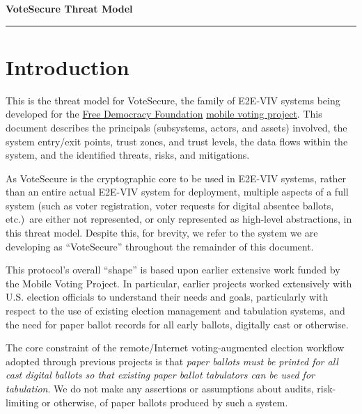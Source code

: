 \documentclass[10pt,letterpaper]{article}
\begin{document}
\begin{center}
{\Large \textbf{VoteSecure Threat Model}}
\end{center}
\vspace{-6pt}

 \hspace{\fill} \textit{\tmdate}

\vspace{-12pt}

\rule{\textwidth}{1pt}

\tableofcontents

\section*{Introduction}
\label{sec:intro}

This is the threat model for VoteSecure, the family of E2E-VIV systems being developed for the \href{https://freedemocracyfoundation.org/}{Free Democracy Foundation} \href{https://mobilevoting.org/}{mobile voting project}. This document describes the principals (subsystems, actors, and assets) involved, the system entry/exit points, trust zones, and trust levels, the data flows within the system, and the identified threats, risks, and mitigations.

As VoteSecure is the cryptographic core to be used in E2E-VIV systems, rather than an entire actual E2E-VIV system for deployment, multiple aspects of a full system (such as voter registration, voter requests for digital absentee ballots, etc.)~are either not represented, or only represented as high-level abstractions, in this threat model. Despite this, for brevity, we refer to the system we are developing as ``VoteSecure'' throughout the remainder of this document.

This protocol's overall ``shape'' is based upon earlier extensive work funded by the Mobile Voting Project. In particular, earlier projects worked extensively with U.S. election officials to understand their needs and goals, particularly with respect to the use of existing election management and tabulation systems, and the need for paper ballot records for all early ballots, digitally cast or otherwise.

The core constraint of the remote/Internet voting-augmented election workflow adopted through previous projects is that \emph{paper ballots must be printed for all cast digital ballots so that existing paper ballot tabulators can be used for tabulation}. We do not make any assertions or assumptions about audits, risk-limiting or otherwise, of paper ballots produced by such a system.
\end{document}
